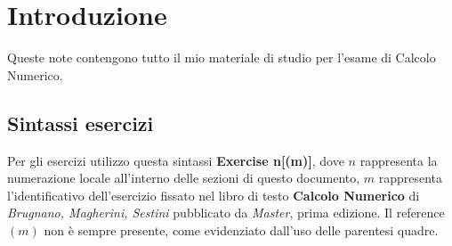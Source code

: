 \section*{Introduzione}
Queste note contengono tutto il mio materiale di studio per l'esame di Calcolo Numerico.

\subsection*{Sintassi esercizi}
Per gli esercizi utilizzo questa sintassi \textbf{Exercise n[(m)]}, dove $n$
rappresenta la numerazione locale all'interno delle sezioni di questo documento, 
$m$ rappresenta l'identificativo dell'esercizio fissato nel libro di testo 
\textbf{Calcolo Numerico} di \emph{Brugnano, Magherini, Sestini} pubblicato da \emph{Master}, 
prima edizione.
Il reference $(m)$ non \`e sempre presente, come evidenziato dall'uso delle parentesi quadre.

